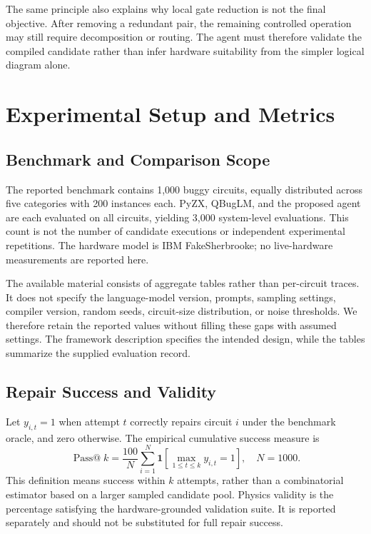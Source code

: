 \documentclass[conference]{IEEEtran}
\newcommand{\ind}{\mathbf{1}}
\begin{document}
The same principle also explains why local gate reduction is not the final objective. After removing a redundant pair, the remaining controlled operation may still require decomposition or routing. The agent must therefore validate the compiled candidate rather than infer hardware suitability from the simpler logical diagram alone.

\section{Experimental Setup and Metrics}
\subsection{Benchmark and Comparison Scope}
The reported benchmark contains 1,000 buggy circuits, equally distributed across five categories with 200 instances each. PyZX, QBugLM, and the proposed agent are each evaluated on all circuits, yielding 3,000 system-level evaluations. This count is not the number of candidate executions or independent experimental repetitions. The hardware model is IBM FakeSherbrooke; no live-hardware measurements are reported here.

The available material consists of aggregate tables rather than per-circuit traces. It does not specify the language-model version, prompts, sampling settings, compiler version, random seeds, circuit-size distribution, or noise thresholds. We therefore retain the reported values without filling these gaps with assumed settings. The framework description specifies the intended design, while the tables summarize the supplied evaluation record.

\subsection{Repair Success and Validity}
Let $y_{i,t}=1$ when attempt $t$ correctly repairs circuit $i$ under the benchmark oracle, and zero otherwise. The empirical cumulative success measure is
\begin{equation}
 \operatorname{Pass@}k=\frac{100}{N}\sum_{i=1}^{N}
 \ind\!\left[\max_{1\leq t\leq k}y_{i,t}=1\right],
 \quad N=1000.
\end{equation}
This definition means success within $k$ attempts, rather than a combinatorial estimator based on a larger sampled candidate pool. Physics validity is the percentage satisfying the hardware-grounded validation suite. It is reported separately and should not be substituted for full repair success.
\end{document}
